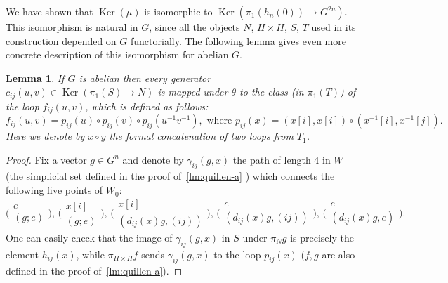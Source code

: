 \documentclass[oneside, 10pt]{amsart}
\theoremstyle{plain}
\numberwithin{equation}{section}
\newtheorem{lemma}{Lemma}
\numberwithin{lemma}{section}
\theoremstyle{remark}
\theoremstyle{definition}
\DeclareMathOperator{\Ker}{Ker}
\begin{document}
We have shown that $\Ker(\mu)$ is isomorphic to $\Ker(\pi_1(h_n(0)) \to G^{2n})$.
This isomorphism is natural in $G$, since all the objects $N$, $H\times H$, $S$, $T$ used in its construction depended on $G$ functorially.
The following lemma gives even more concrete description of this isomorphism for abelian $G$.
\begin{lemma} \label{lem:concrete-formula}
 If $G$ is abelian then every generator $c_{ij}(u, v) \in \Ker(\pi_1(S)\to N)$ is mapped under $\theta$ to the class (in $\pi_1(T)$) of the loop $f_{ij}(u, v)$, 
  which is defined as follows:
 \[f_{ij}(u,v) = p_{ij}(u) \circ p_{ij}(v) \circ p_{ij}(u^{-1} v^{-1}), \text{ where }
   p_{ij}(x)=(x[i], x[i]) \circ (x^{-1}[i], x^{-1}[j]).\]
 Here we denote by $x \circ y$ the formal concatenation of two loops from $T_1$.
\end{lemma}
\begin{proof}
Fix a vector $g\in G^n$ and denote by $\gamma_{ij}(g, x)$ the path of length $4$ in $W$ (the simplicial set defined in the proof of~\cref{lm:quillen-a} ) which connects 
the following five points of $W_0$:
\[
\Big(\begin{smallmatrix} e    \\ (g; e) \end{smallmatrix}\Big),\,
\Big(\begin{smallmatrix} x[i] \\ (g; e) \end{smallmatrix}\Big),\,
\Big(\begin{smallmatrix} x[i] \\ (d_{ij}(x) g, (ij)) \end{smallmatrix}\Big),\,
\Big(\begin{smallmatrix} e    \\ (d_{ij}(x) g, (ij)) \end{smallmatrix}\Big),\,
\Big(\begin{smallmatrix} e    \\ (d_{ij}(x) g, e) \end{smallmatrix}\Big).\]
One can easily check that the image of $\gamma_{ij}(g, x)$ in $S$ under $\pi_N g$ is precisely the element $h_{ij}(x)$, while
$\pi_{H\times H} f$ sends $\gamma_{ij}(g, x)$ to the loop $p_{ij}(x)$ ($f, g$ are also defined in the proof of~\cref{lm:quillen-a}).
\end{proof}
\end{document}
